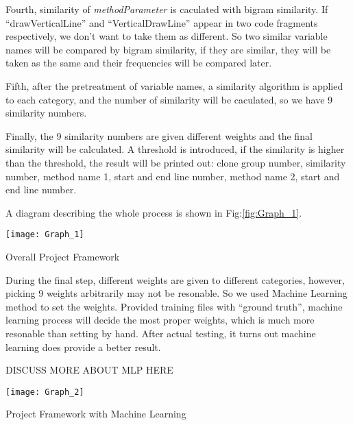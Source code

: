 \documentclass[../main.tex]{subfiles}
\begin{document}
Fourth, similarity of \textit{methodParameter} is caculated with bigram similarity. If ``drawVerticalLine'' and ``VerticalDrawLine'' appear in two code fragments respectively, we don't want to take them as different. So two similar variable names will be compared by bigram similarity, if they are similar, they will be taken as the same and their frequencies will be compared later.

Fifth, after the pretreatment of variable names, a similarity algorithm is applied to each category, and the number of similarity will be caculated, so we have 9 similarity numbers.

Finally, the 9 similarity numbers are given different weights and the final similarity will be calculated. A threshold is introduced, if the similarity is higher than the threshold, the result will be printed out: clone group number, similarity number, method name 1, start and end line number, method name 2, start and end line number.

A diagram describing the whole process is shown in Fig:\ref{fig:Graph_1}.\\

\begin{figurehere}
\centering \texttt{[image: Graph\_1]} 
\caption{Overall Project Framework} \label{fig:Graph_1}
\end{figurehere}

During the final step, different weights are given to different categories, however, picking 9 weights arbitrarily may not be resonable. So we used Machine Learning method to set the weights. Provided training files with ``ground truth'', machine learning process will decide the most proper weights, which is much more resonable than setting by hand. After actual testing, it turns out machine learning does provide a better result.

DISCUSS MORE ABOUT MLP HERE\\

\begin{figurehere}
\centering \texttt{[image: Graph\_2]} 
\caption{Project Framework with Machine Learning} \label{fig:Graph_2}
\end{figurehere}
\end{document}
